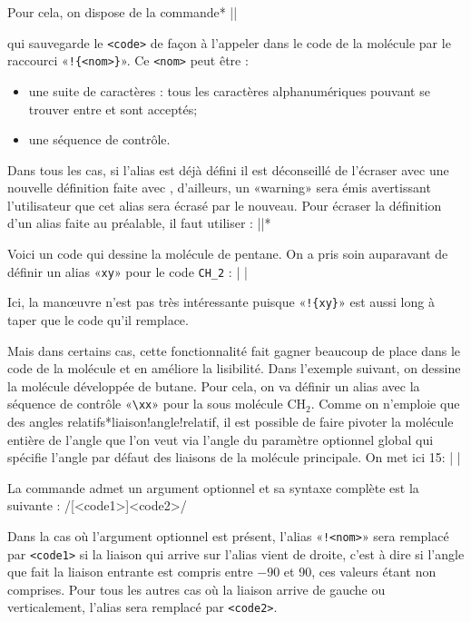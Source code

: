 \documentclass[10pt]{article}
\makeatletter
\newcommand\idx{\@ifstar{\let\print@or@not\@gobble\idx@}{\let\print@or@not\@firstofone\idx@}}
\newcommand\idx@[1]{%
	\ifcat\expandafter\noexpand\@car#1\@nil\relax%
		\expandafter\ifx\@car#1\@nil\protect
			\index{#1}%
			\print@or@not{#1}%
		\else
			\saveexpandmode\expandarg
			\StrSubstitute{\string#1}{\string @}{\@empty\protect\symbol{'100}}[\temp@]%
			\StrGobbleLeft\temp@1[\temp@]%
			\restoreexpandmode
			\expandafter\index\expandafter{\temp@ @\protect\texttt{\protect\textbackslash\temp@}}%
			\print@or@not{\texttt{\string#1}}%
		\fi
	\else
		\index{#1}%
		\print@or@not{#1}%
	\fi
}
\newcommand\make@car@active[1]{%
	\catcode`#1\active
	\begingroup
		\lccode`\~`#1\relax
		\lowercase{\endgroup\def~}%
}
\newif\if@exstar
\newcommand\exemple{%
	\begingroup
	\parskip\z@
	\@makeother\;\@makeother\!\@makeother\?\@makeother\:%
	\@ifstar{\@exstartrue\exemple@}{\@exstarfalse\exemple@}}
\newcommand\exemple@[2][65]{%
	\medbreak\noindent
	\begingroup
		\let\do\@makeother\dospecials
		\make@car@active\ { {}}%
		\make@car@active\^^M{\par\leavevmode}%
		\make@car@active\^^I{\space\space}%
		\make@car@active\,{\leavevmode\kern\z@\string,}%
		\make@car@active\-{\leavevmode\kern\z@\string-}%
		\make@car@active\>{\leavevmode\kern\z@\string>}%
		\make@car@active\<{\leavevmode\kern\z@\string<}%
		\exemple@@{#1}{#2}%
}
\newcommand\exemple@@[3]{%
	\def\@tempa##1#3{\exemple@@@{#1}{#2}{##1}}%
	\@tempa
}
\newcommand\exemple@@@[3]{%
	\xdef\the@code{#3}%
	\endgroup
	\if@exstar
		\begingroup
			\fboxrule0.4pt
			\let\breakboxparindent\z@
			\def\bkvz@bottom{\hrule\@height\fboxrule}%
			\let\bkvz@before@breakbox\relax
			\def\bkvz@set@linewidth{\advance\linewidth\dimexpr-2\fboxrule-2\fboxsep}%
			\def\bkvz@left{\vrule\@width\fboxrule\hskip\fboxsep}%
			\def\bkvz@right{\hskip\fboxsep\vrule\@width\fboxrule}%
			\def\bkvz@top{\hbox to \hsize{%
				\vrule\@width\fboxrule\@height\fboxrule
				\leaders\bkvz@bottom\hfill
				\ECFAugie
				\fboxsep\z@
				\colorbox{black}{\kern0.25em\color{white}\footnotesize\lower0.5ex\hbox{\strut#2}\kern0.25em}%
				\leaders\bkvz@bottom\hfill
				\vrule\@width\fboxrule\@height\fboxrule}}%
			\breakbox
				\kern.5ex\relax
				\ttfamily\footnotesize\the@code\par
				\normalfont
				\kern3pt
				\hrule height0.1pt width\linewidth depth0.1pt
				\vskip5pt
				\rightskip0pt plus 1fill
				\everypar{{\color{lightgray}\rlap{\vrule height0.1pt width\linewidth depth0.1pt}}\hskip0pt plus 1fill}%
				\newlinechar`\^^M\everyeof{\noexpand}\scantokens{#3}\par
			\endbreakbox
		\endgroup
	\else
		\vskip0.5ex
		\boxput*(0,1)
			{\fboxsep\z@
			\hbox{\ECFAugie\colorbox{black}{\leavevmode\kern0.25em{\color{white}\footnotesize\strut#2}\kern0.25em}}%
			}%
			{\fboxsep5pt
			\fbox{%
				$\vcenter{\hsize\dimexpr0.#1\linewidth-\fboxsep-\fboxrule\relax
					\kern5pt\parskip0pt \ttfamily\footnotesize\the@code}%
				\vcenter{\kern5pt\hsize\dimexpr\linewidth-0.#1\linewidth-\fboxsep-\fboxrule\relax
					\everypar{{\color{lightgray}\rlap{\vrule height0.1pt width\dimexpr\linewidth-0.#1\linewidth-\fboxsep-\fboxrule depth0.1pt}}}%
					\footnotesize\newlinechar`\^^M\everyeof{\noexpand}\scantokens{#3}}$%
				}%
			}%
	\fi
	\medbreak
	\endgroup
}
\let\do\@makeother\dospecials
\makeatother
\begin{document}
Pour cela, on dispose de la commande\idx*{}
\centerverb||
\smallskip

qui sauvegarde le \verb/<code>/ de façon à l'appeler dans le code de la molécule par le raccourci «\verb/!{<nom>}/». Ce \verb-<nom>- peut être :
\begin{itemize}
	\item une suite de caractères : tous les caractères alphanumériques pouvant se trouver entre \texttt{\string\csname} et \texttt{\string\endcsname} sont acceptés;
	\item une séquence de contrôle.
\end{itemize}

Dans tous les cas, si l'alias est déjà défini il est déconseillé de l'écraser avec une nouvelle définition faite avec \idx{\definesubmol}, d'ailleurs, un «warning» sera émis avertissant l'utilisateur que cet alias sera écrasé par le nouveau. Pour écraser la définition d'un alias faite au préalable, il faut utiliser :\label{redefinesubmol}
\centerverb||\idx*\redefinesubmol
\smallskip

Voici un code qui dessine la molécule de pentane. On a pris soin auparavant de définir un alias «\verb/xy/» pour le code \verb/CH_2/ :
\exemple{Pentane}|
|

Ici, la manœuvre n'est pas très intéressante puisque «\verb/!{xy}/» est aussi long à taper que le code qu'il remplace.

Mais dans certains cas, cette fonctionnalité fait gagner beaucoup de place dans le code de la molécule et en améliore la lisibilité. Dans l'exemple suivant, on dessine la molécule développée de butane. Pour cela, on va définir un alias avec la séquence de contrôle «\verb/\xx/» pour la sous molécule $\mathrm{CH_2}$. Comme on n'emploie que des angles relatifs\idx*{liaison!angle!relatif}, il est possible de faire pivoter la molécule entière de l'angle que l'on veut via l'angle du paramètre optionnel global qui spécifie l'angle par défaut des liaisons de la molécule principale. On met ici 15\degres :
\exemple{Butane}|
|

La commande \idx{\definesubmol} admet un argument optionnel et sa syntaxe complète est la suivante :
\centerverb/[<code1>]{<code2>}/
\medskip

Dans la cas où l'argument optionnel est présent, l'alias «\verb-!<nom>-» sera remplacé par \verb'<code1>' si la liaison qui arrive sur l'alias vient de droite, c'est à dire si l'angle que fait la liaison entrante est compris entre $-90$\degres{} et 90\degres{}, ces valeurs étant non comprises. Pour tous les autres cas où la liaison arrive de gauche ou verticalement, l'alias sera remplacé par \verb-<code2>-.
\end{document}
